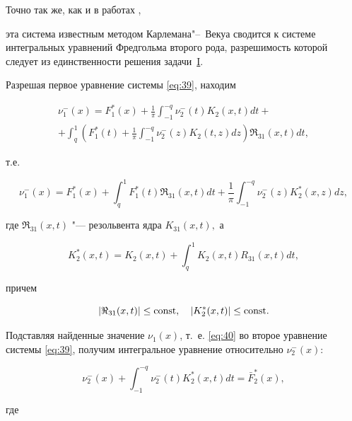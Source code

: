 Точно так же, как и в  работах \cite{Abd:bib:Abdullaev, Islabd:bib:Islomabdul}, 

эта система известным методом Карлемана"--~Векуа \cite{Musxel:bib:Musxelesh} сводится к системе интегральных уравнений Фредгольма второго рода, разрешимость которой следует из единственности решения задачи~\hyperlink{abd:taskI}{I}.



Разрешая первое уравнение системы \eqref{eq:39}, находим

\begin{multline}

\nu _1^ - (x) = F_{1}^ * (x) + \frac{1}{\pi } \int _{ - 1}^{ - q} {\nu _2^ - (t){K_2}(x,t)dt}  + 

\\

 +  \int _q^1 {\left( {F_{1}^ * (t) + \frac{1}{\pi } \int _{ - 1}^{ - q} {\nu _2^ - (z){K_2}(t,z)dz} } \right){\Re_{31}}(x,t)dt},

\end{multline}

т.е.

\begin{equation}

\nu _1^- (x) = F_{1}^*(x) +  \int _q^1 {F_1^*(t){\Re_{31}}(x,t)dt} + \frac{1}{\pi } \int _{ - 1}^{ - q} {\nu _2^ - (z)K_2^ * (x,z)dz}, \label{eq:40}

\end{equation}

где  ${\Re_{31}}(x,t)$ "--- резольвента ядра  ${K_{31}}(x,t),$ а

$$K_2^*(x,t) = {K_2}(x,t) +  \int _q^1 {{K_2}(x,t)} {R_{31}}(x,t)dt,$$

причем  

$$

| {{\Re_{31}}(x,t)} | \le {\rm const},  \quad  

| {K_2^*(x,t)} | \le \rm const.$$

Подставляя найденные значение $ \nu _1^{}(x)$, т.~е. \eqref{eq:40} во второе уравнение системы \eqref{eq:39}, получим интегральное уравнение относительно $\nu _2^ - (x)$:

\begin{equation}

\nu _2^ - (x) +  \int _{ - 1}^{ - q} {\nu _2^ - (t)K_2^ * (x,t)dt}  = \bar F_2^ * (x), \label{eq:41}

\end{equation}

где

